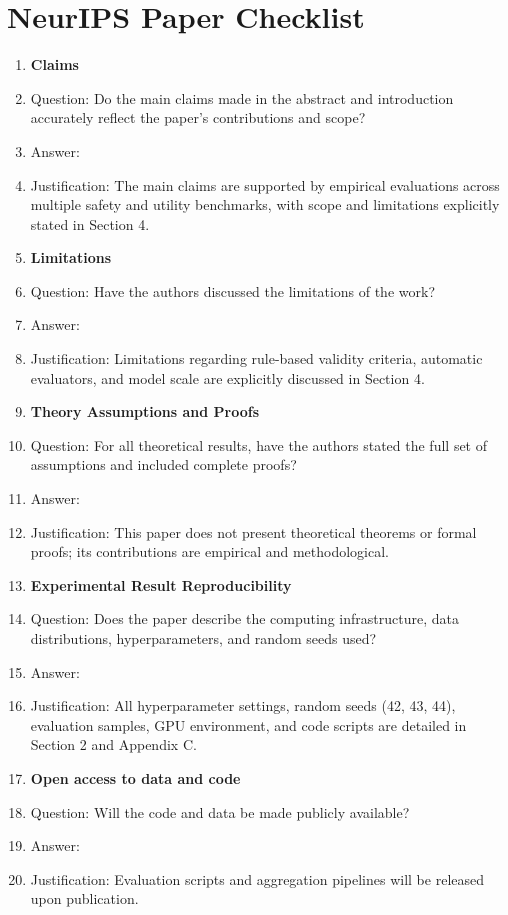 \section*{NeurIPS Paper Checklist}

\begin{enumerate}

\item {\bf Claims}
  \item[] Question: Do the main claims made in the abstract and introduction accurately reflect the paper's contributions and scope?
  \item[] Answer: \answerYes{}
  \item[] Justification: The main claims are supported by empirical evaluations across multiple safety and utility benchmarks, with scope and limitations explicitly stated in Section 4.

\item {\bf Limitations}
  \item[] Question: Have the authors discussed the limitations of the work?
  \item[] Answer: \answerYes{}
  \item[] Justification: Limitations regarding rule-based validity criteria, automatic evaluators, and model scale are explicitly discussed in Section 4.

\item {\bf Theory Assumptions and Proofs}
  \item[] Question: For all theoretical results, have the authors stated the full set of assumptions and included complete proofs?
  \item[] Answer: \answerNA{}
  \item[] Justification: This paper does not present theoretical theorems or formal proofs; its contributions are empirical and methodological.

\item {\bf Experimental Result Reproducibility}
  \item[] Question: Does the paper describe the computing infrastructure, data distributions, hyperparameters, and random seeds used?
  \item[] Answer: \answerYes{}
  \item[] Justification: All hyperparameter settings, random seeds (42, 43, 44), evaluation samples, GPU environment, and code scripts are detailed in Section 2 and Appendix C.

\item {\bf Open access to data and code}
  \item[] Question: Will the code and data be made publicly available?
  \item[] Answer: \answerYes{}
  \item[] Justification: Evaluation scripts and aggregation pipelines will be released upon publication.


\end{enumerate}
